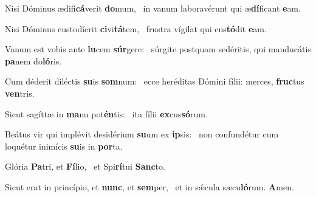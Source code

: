 \item Nisi Dóminus ædifi\textbf{cá}verit \textbf{do}mum,~\psstar{} in vanum laboravérunt qui æ\textbf{dí}ficant \textbf{e}am.

\item Nisi Dóminus custodíerit \textbf{ci}vi\textbf{tá}tem,~\psstar{} frustra vígilat qui cus\textbf{tó}dit \textbf{e}am.

\item Vanum est vobis ante \textbf{lu}cem \textbf{súr}gere:~\psstar{} súrgite postquam sedéritis, qui manducátis \textbf{pa}nem do\textbf{ló}ris.

\item Cum déderit diléctis \textbf{su}is \textbf{som}num:~\psstar{} ecce heréditas Dómini fílii: merces, \textbf{fruc}tus \textbf{ven}tris.

\item Sicut sagíttæ in \textbf{ma}nu pot\textbf{én}tis:~\psstar{} ita fílii \textbf{ex}cus\textbf{só}rum.

\item Beátus vir qui implévit desidérium \textbf{su}um ex \textbf{ip}sis:~\psstar{} non confundétur cum loquétur inimícis \textbf{su}is in \textbf{por}ta.

\item Glória \textbf{Pa}tri, et \textbf{Fí}lio,~\psstar{} et Spi\textbf{rí}tui \textbf{Sanc}to.

\item Sicut erat in princípio, et \textbf{nunc}, et \textbf{sem}per,~\psstar{} et in sǽcula sæcu\textbf{ló}rum. \textbf{A}men.